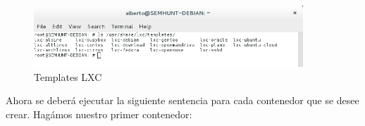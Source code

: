 \documentclass[1pt]{article} %
\begin{document}
\begin{center}
\end{center}
\begin{figure}[!ht]
	\begin{center}
		\includegraphics[width=0.9\textwidth]{7.png}
		\caption{Templates LXC}
	\end{center}
\end{figure}
Ahora se deberá ejecutar la siguiente sentencia para cada contenedor que se desee crear. Hagámos nuestro primer contenedor:
\end{document}
